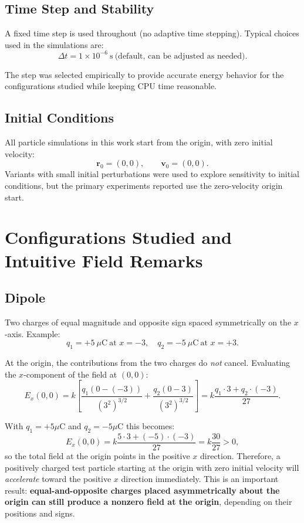 \documentclass[12pt,a4paper]{article}
\begin{document}
\subsection{Time Step and Stability}
A fixed time step is used throughout (no adaptive time stepping). Typical choices used in the simulations are:
\[
    \Delta t = 1\times 10^{-6}\ \mathrm{s}\ \text{(default, can be adjusted as needed)}.
\]

The step was selected empirically to provide accurate energy behavior for the configurations studied while keeping CPU time reasonable.

\subsection{Initial Conditions}
All particle simulations in this work start from the origin, with zero initial velocity:
\[
    \mathbf{r}_0 = (0,0),\qquad \mathbf{v}_0 = (0,0).
\]
Variants with small initial perturbations were used to explore sensitivity to initial conditions, but the primary experiments reported use the zero-velocity origin start.

\section{Configurations Studied and Intuitive Field Remarks}

\subsection{Dipole}
Two charges of equal magnitude and opposite sign spaced symmetrically on the $x$-axis. Example:
\[
    q_1 = +5\ \mu\mathrm{C}\ \text{at } x=-3,\quad q_2 = -5\ \mu\mathrm{C}\ \text{at } x=+3.
\]

At the origin, the contributions from the two charges do \emph{not} cancel. Evaluating the $x$-component of the field at $(0,0)$:
\[
    E_x(0,0) = k\left[\frac{q_1(0-(-3))}{(3^2)^{3/2}} + \frac{q_2(0-3)}{(3^2)^{3/2}}\right]
    = k\frac{q_1\cdot 3 + q_2 \cdot (-3)}{27}.
\]

With $q_1=+5\mu\text{C}$ and $q_2=-5\mu\text{C}$ this becomes:
\[
    E_x(0,0) = k\frac{5\cdot 3 + (-5)\cdot(-3)}{27} = k\frac{30}{27} > 0,
\]
so the total field at the origin points in the positive $x$ direction. Therefore, a positively charged test particle starting at the origin with zero initial velocity will \emph{accelerate} toward the positive $x$ direction immediately. This is an important result: \textbf{equal-and-opposite charges placed asymmetrically about the origin can still produce a nonzero field at the origin}, depending on their positions and signs.
\end{document}
